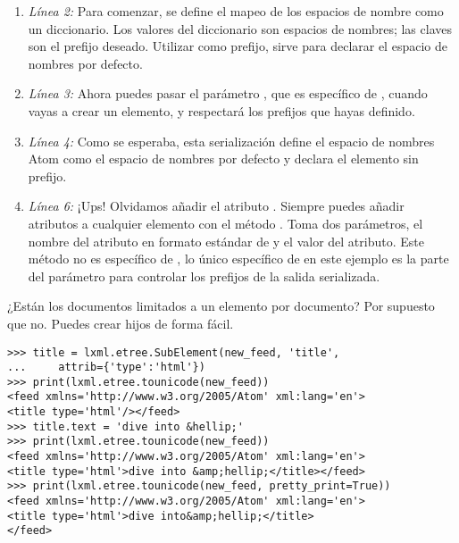 \begin{enumerate}

\item \emph{Línea 2:} Para comenzar, se define el mapeo de los espacios de nombre como un diccionario. Los valores del diccionario son espacios de nombres; las claves son el prefijo deseado. Utilizar  como prefijo, sirve para declarar el espacio de nombres por defecto.

\item \emph{Línea 3:} Ahora puedes pasar el parámetro , que es específico de , cuando vayas a crear un elemento, y  respectará los prefijos que hayas definido.

\item \emph{Línea 4:} Como se esperaba, esta serialización define el espacio de nombres Atom como el espacio de nombres por defecto y declara el elemento  sin prefijo.

\item \emph{Línea 6:} ¡Ups! Olvidamos añadir el atributo . Siempre puedes añadir atributos a cualquier elemento con el método . Toma dos parámetros, el nombre del atributo en formato estándar de  y el valor del atributo. Este método no es específico de , lo único específico de  en este ejemplo es la parte del parámetro  para controlar los prefijos de la salida serializada.

\end{enumerate}

¿Están los documentos  limitados a un elemento por documento? Por supuesto que no. Puedes crear hijos de forma fácil.

\noindent\begin{minipage}{\textwidth}
\begin{lstlisting}[mathescape=True]
>>> title = lxml.etree.SubElement(new_feed, 'title',
...     attrib={'type':'html'})
>>> print(lxml.etree.tounicode(new_feed))
<feed xmlns='http://www.w3.org/2005/Atom' xml:lang='en'>
<title type='html'/></feed>
>>> title.text = 'dive into &hellip;'
>>> print(lxml.etree.tounicode(new_feed))
<feed xmlns='http://www.w3.org/2005/Atom' xml:lang='en'>
<title type='html'>dive into &amp;hellip;</title></feed>
>>> print(lxml.etree.tounicode(new_feed, pretty_print=True))
<feed xmlns='http://www.w3.org/2005/Atom' xml:lang='en'>
<title type='html'>dive into&amp;hellip;</title>
</feed>
\end{lstlisting}
\end{minipage}

